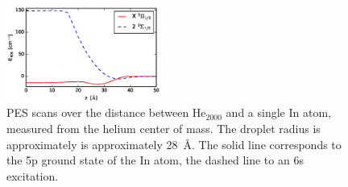 \documentclass[twoside,twocolumn,9pt]{article}
\begin{document}
\begin{figure}[htbp!]
  	\begin{center}
 		\includegraphics[width=0.45\textwidth]{3.eps}
                \caption{PES scans over the distance between He$_{2000}$ and a single In atom, measured from the helium center of mass. The droplet radius is approximately is approximately 28~\AA. The solid line corresponds to the 5p ground state of the In atom, the dashed line to an 6s excitation.\label{pic:scan}}
  	\end{center}
\end{figure}
\end{document}
